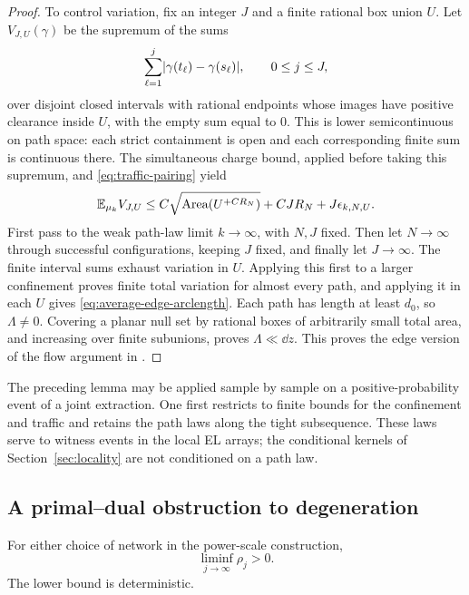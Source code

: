 \begin{proof}
To control variation, fix an integer \(J\) and a finite rational box
union \(U\).  Let \(V_{J,U}(\gamma)\) be the supremum of the sums
\[
 \sum_{\ell=1}^j\lvert \gamma(t_\ell)-\gamma(s_\ell)\rvert,\qquad 0\le j\le J,
\]
over disjoint closed intervals with rational endpoints whose images have
positive clearance inside \(U\), with the empty sum equal to \(0\).
This is lower semicontinuous on path
space: each strict containment is open and each corresponding finite sum
is continuous there.  The simultaneous charge bound, applied before
taking this supremum, and \eqref{eq:traffic-pairing} yield
\[
 \mathbb E_{\mu_k}V_{J,U}
 \le C\sqrt{\operatorname{Area}(U^{+CR_N})}
       +CJR_N+J\epsilon_{k,N,U}.
\]
First pass to the weak path-law limit \(k\to\infty\), with \(N,J\) fixed.
Then let \(N\to\infty\) through successful configurations, keeping \(J\)
fixed, and finally let \(J\to\infty\).  The finite interval sums exhaust
variation in \(U\).  Applying this first to a larger confinement proves
finite total variation for almost every path, and applying it in each
\(U\) gives \eqref{eq:average-edge-arclength}.  Each path has length at
least \(d_0\), so \(\Lambda\ne0\).  Covering a planar null set by rational
boxes of arbitrarily small total area, and increasing over finite
subunions, proves \(\Lambda\ll\dd z\).  This proves the edge version of
the flow argument in \cite[Section~8]{C}.
\end{proof}

The preceding lemma may be applied sample by sample on a positive-probability
event of a joint extraction.  One first restricts to finite bounds for the
confinement and traffic and retains the path laws along the tight
subsequence.  These laws serve to witness events in the local EL arrays;
the conditional kernels of Section~\ref{sec:locality} are not conditioned
on a path law.

\subsection{A primal--dual obstruction to degeneration}

\begin{proposition}\label{prop:edge-quantiles}
For either choice of network in the power-scale construction,
\[
 \liminf_{j\to\infty}\rho_j>0.
\]
The lower bound is deterministic.
\end{proposition}

